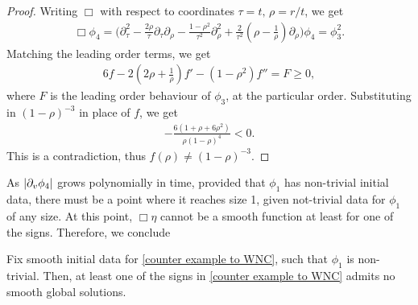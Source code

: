 \documentclass[11pt, oneside]{amsart}
\begin{document}
\begin{proof}
		Writing $\Box$ with respect to coordinates $\tau=t,\,\rho=r/t$, we get
		\begin{equation*}
			\begin{gathered}
				\Box\phi_4=\bigg(\partial_\tau^2-\frac{2\rho}{\tau}\partial_\tau\partial_\rho-\frac{1-\rho^2}{\tau^2}\partial_\rho^2+\frac{2}{\tau^2}(\rho-\frac{1}{\rho})\partial_\rho\bigg)\phi_4=\phi_3^2.
			\end{gathered}
		\end{equation*}
		Matching the leading order terms, we get 
		\begin{equation*}
			\begin{gathered}
				6f-2(2\rho+\frac{1}{\rho})f'-(1-\rho^2)f''=F\geq0,
			\end{gathered}
		\end{equation*}
		where $F$ is the leading order behaviour of $\phi_3$, at the particular order. Substituting in $(1-\rho)^{-3}$ in place of $f$, we get
		\begin{equation*}
			\begin{gathered}
				-\frac{6(1+\rho+6\rho^2)}{\rho(1-\rho)^4}<0.
			\end{gathered}
		\end{equation*}
		This is a contradiction, thus $f(\rho)\neq(1-\rho)^{-3}$.
	\end{proof}

	As $\left\lvert \partial_v\phi_4\right\rvert$ grows polynomially in time, provided that $\phi_1$ has non-trivial initial data, there must be a point where it reaches size 1, given not-trivial data for $\phi_1$ of any size. At this point, $\Box\eta$ cannot be a smooth function at least for one of the signs. Therefore, we conclude
	
	\begin{cor}\label{WNC cor}
		Fix smooth initial data for \cref{counter example to WNC}, such that $\phi_1$ is non-trivial. Then, at least one of the signs in \cref{counter example to WNC} admits no smooth global solutions.
	\end{cor}







	
	
\end{document}
